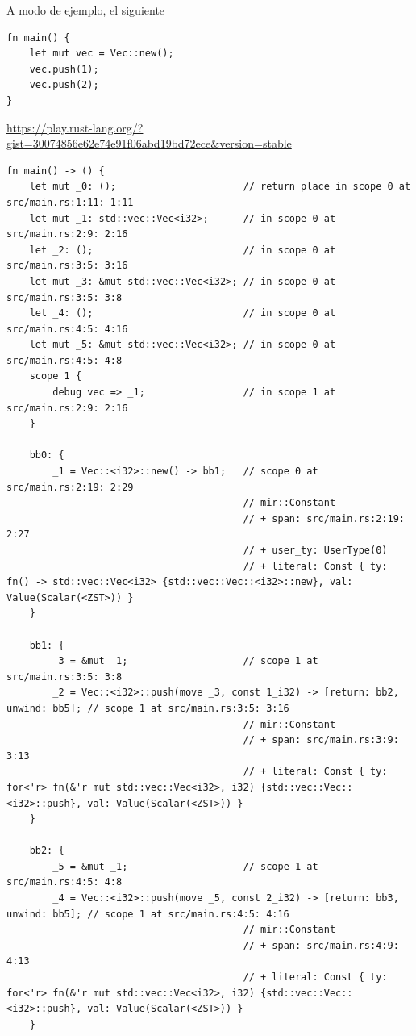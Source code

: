 \documentclass[12pt, a4paper]{article}
\begin{document}
A modo de ejemplo, el siguiente

\begin{verbatim}
fn main() {
    let mut vec = Vec::new();
    vec.push(1);
    vec.push(2);
}
\end{verbatim}

\url{https://play.rust-lang.org/?gist=30074856e62e74e91f06abd19bd72ece&version=stable}

\begin{verbatim}
fn main() -> () {
    let mut _0: ();                      // return place in scope 0 at src/main.rs:1:11: 1:11
    let mut _1: std::vec::Vec<i32>;      // in scope 0 at src/main.rs:2:9: 2:16
    let _2: ();                          // in scope 0 at src/main.rs:3:5: 3:16
    let mut _3: &mut std::vec::Vec<i32>; // in scope 0 at src/main.rs:3:5: 3:8
    let _4: ();                          // in scope 0 at src/main.rs:4:5: 4:16
    let mut _5: &mut std::vec::Vec<i32>; // in scope 0 at src/main.rs:4:5: 4:8
    scope 1 {
        debug vec => _1;                 // in scope 1 at src/main.rs:2:9: 2:16
    }

    bb0: {
        _1 = Vec::<i32>::new() -> bb1;   // scope 0 at src/main.rs:2:19: 2:29
                                         // mir::Constant
                                         // + span: src/main.rs:2:19: 2:27
                                         // + user_ty: UserType(0)
                                         // + literal: Const { ty: fn() -> std::vec::Vec<i32> {std::vec::Vec::<i32>::new}, val: Value(Scalar(<ZST>)) }
    }

    bb1: {
        _3 = &mut _1;                    // scope 1 at src/main.rs:3:5: 3:8
        _2 = Vec::<i32>::push(move _3, const 1_i32) -> [return: bb2, unwind: bb5]; // scope 1 at src/main.rs:3:5: 3:16
                                         // mir::Constant
                                         // + span: src/main.rs:3:9: 3:13
                                         // + literal: Const { ty: for<'r> fn(&'r mut std::vec::Vec<i32>, i32) {std::vec::Vec::<i32>::push}, val: Value(Scalar(<ZST>)) }
    }

    bb2: {
        _5 = &mut _1;                    // scope 1 at src/main.rs:4:5: 4:8
        _4 = Vec::<i32>::push(move _5, const 2_i32) -> [return: bb3, unwind: bb5]; // scope 1 at src/main.rs:4:5: 4:16
                                         // mir::Constant
                                         // + span: src/main.rs:4:9: 4:13
                                         // + literal: Const { ty: for<'r> fn(&'r mut std::vec::Vec<i32>, i32) {std::vec::Vec::<i32>::push}, val: Value(Scalar(<ZST>)) }
    }


\end{verbatim}
\end{document}
